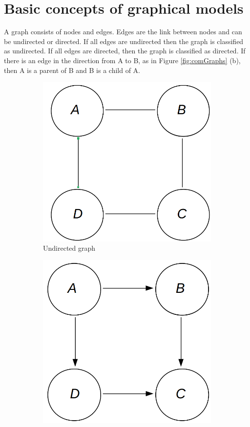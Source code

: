 \documentclass[12pt,oneside,openany,a4paper, %
afrikaans,english,
]{memoir}
\numberwithin{equation}{chapter}
\begin{document}
\section{Basic concepts of graphical models}
A graph consists of nodes and edges. Edges are the link between nodes and can be undirected or directed. If all edges are undirected then the graph is classified as undirected. If all edges are directed, then the graph is classified as directed. If there is an edge in the direction from A to B, as in Figure \ref{fig:comGraphs} (b), then A is a parent of B and B is a child of A.
\begin{figure}[h!]
  \centering
  \begin{subfigure}[b]{0.3\linewidth}
    \includegraphics[width=\linewidth]{Figures/undirected_graph.png}
    \caption{Undirected graph}
  \end{subfigure}
  \begin{subfigure}[b]{0.3\linewidth}
    \includegraphics[width=\linewidth]{Figures/directed_graph.png}

\end{subfigure}
\end{figure}
\end{document}
